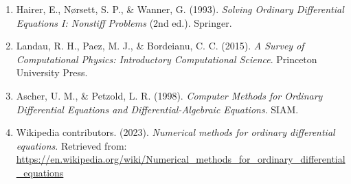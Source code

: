 \documentclass[12pt]{article}
\begin{document}
\begin{enumerate}
    \item Hairer, E., Nørsett, S. P., \& Wanner, G. (1993). \textit{Solving Ordinary Differential Equations I: Nonstiff Problems} (2nd ed.). Springer.
    \item Landau, R. H., Paez, M. J., \& Bordeianu, C. C. (2015). \textit{A Survey of Computational Physics: Introductory Computational Science}. Princeton University Press.
    \item Ascher, U. M., \& Petzold, L. R. (1998). \textit{Computer Methods for Ordinary Differential Equations and Differential-Algebraic Equations}. SIAM.
    \item Wikipedia contributors. (2023). \textit{Numerical methods for ordinary differential equations}. Retrieved from: \url{https://en.wikipedia.org/wiki/Numerical_methods_for_ordinary_differential_equations}
\end{enumerate}
\end{document}
